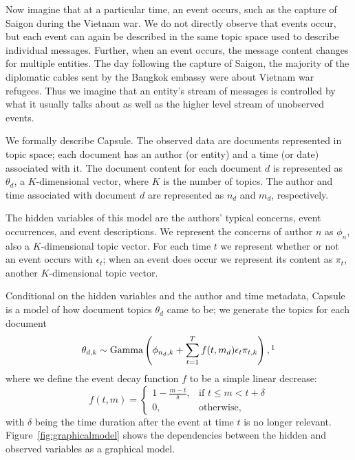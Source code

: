 Now imagine that at a particular time, an event occurs, such as the capture of Saigon during the Vietnam war.  We do not directly observe that events occur, but each event can again be described in the same topic space used to describe individual messages.  Further, when an event occurs, the message content changes for multiple entities. The day following the capture of Saigon, the majority of the diplomatic cables sent by the Bangkok embassy were about Vietnam war refugees.
Thus we imagine that an entity's stream of messages is controlled by what it usually talks about as well as the higher level stream of unobserved events.

We formally describe Capsule. The observed data are documents represented in topic space; each document has an author (or entity) and a time (or date) associated with it.  The document content for each document $d$ is represented as $\theta_d$, a $K$-dimensional vector, where $K$ is the number of topics.  The author and time associated with document $d$ are represented as $n_d$ and $m_d$, respectively.

The hidden variables of this model are the authors' typical concerns, event occurrences, and event descriptions.  We represent the concerns of author $n$ as $\phi_n$, also a $K$-dimensional topic vector.  For each time $t$ we represent whether or not an event occurs with $\epsilon_t$; when an event does occur we represent its content as $\pi_t$, another $K$-dimensional topic vector.

Conditional on the hidden variables and the author and time metadata, Capsule is a model of how document topics $\theta_d$ came to be; we generate the topics for each document
\begin{equation}
\theta_{d,k} \sim \mbox{Gamma}\left(\phi_{n_d,k} + \sum_{t=1}^T f(t, m_d) \epsilon_t \pi_{t,k}\right),\footnotemark
\end{equation}
where we define the event decay function $f$ to be a simple linear decrease: \[f(t, m) =
\begin{cases}
  1 - \frac{m-t}{\delta}, & \mbox{if } t \le m < t+\delta \\
  0, & \mbox{otherwise,}
\end{cases} \] with $\delta$ being the time duration after the event at time $t$ is no longer relevant.  Figure~\ref{fig:graphicalmodel} shows the dependencies between the hidden and observed variables as a graphical model.

